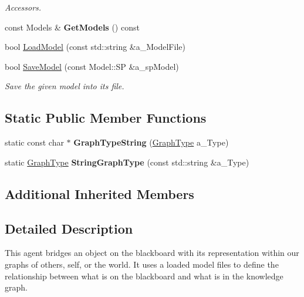 \begin{DoxyCompactItemize}
\begin{DoxyCompactList}\small\item\em Accessors. \end{DoxyCompactList}\item 
\mbox{\label{class_model_agent_af179fb7e54b6329ee84434be7819bb8b}} 
const Models \& {\bfseries Get\+Models} () const
\item 
bool \hyperlink{class_model_agent_af75ddec339ede2777221a8fcd91b6044}{Load\+Model} (const std\+::string \&a\+\_\+\+Model\+File)
\item 
\mbox{\label{class_model_agent_a67350e55d5c981b854c624eb6365d64c}} 
bool \hyperlink{class_model_agent_a67350e55d5c981b854c624eb6365d64c}{Save\+Model} (const Model\+::\+SP \&a\+\_\+sp\+Model)
\begin{DoxyCompactList}\small\item\em Save the given model into it\textquotesingle{}s file. \end{DoxyCompactList}\end{DoxyCompactItemize}
\subsection*{Static Public Member Functions}
\begin{DoxyCompactItemize}
\item 
\mbox{\label{class_model_agent_a02561694b29a4803437f2a79d68366d1}} 
static const char $\ast$ {\bfseries Graph\+Type\+String} (\hyperlink{class_model_agent_a0e4db842aaa669acc5da6c17fae0a2de}{Graph\+Type} a\+\_\+\+Type)
\item 
\mbox{\label{class_model_agent_a332382409bf973c757fe6f960f41bae9}} 
static \hyperlink{class_model_agent_a0e4db842aaa669acc5da6c17fae0a2de}{Graph\+Type} {\bfseries String\+Graph\+Type} (const std\+::string \&a\+\_\+\+Type)
\end{DoxyCompactItemize}
\subsection*{Additional Inherited Members}


\subsection{Detailed Description}
This agent bridges an object on the blackboard with it\textquotesingle{}s representation within our graphs of others, self, or the world. It uses a loaded model files to define the relationship between what is on the blackboard and what is in the knowledge graph. 


